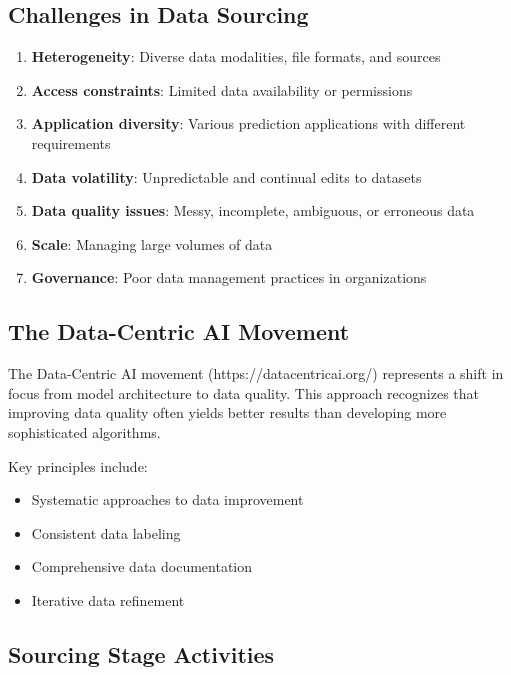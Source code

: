 \documentclass[12pt]{article}
\begin{document}
\subsection{Challenges in Data Sourcing}
\begin{enumerate}
    \item \textbf{Heterogeneity}: Diverse data modalities, file formats, and sources
    \item \textbf{Access constraints}: Limited data availability or permissions
    \item \textbf{Application diversity}: Various prediction applications with different requirements
    \item \textbf{Data volatility}: Unpredictable and continual edits to datasets
    \item \textbf{Data quality issues}: Messy, incomplete, ambiguous, or erroneous data
    \item \textbf{Scale}: Managing large volumes of data
    \item \textbf{Governance}: Poor data management practices in organizations
\end{enumerate}

\subsection{The Data-Centric AI Movement}

\begin{tcolorbox}[colback=blue!5!white,colframe=blue!75!black,title={Data-Centric AI}]
The Data-Centric AI movement (https://datacentricai.org/) represents a shift in focus from model architecture to data quality. This approach recognizes that improving data quality often yields better results than developing more sophisticated algorithms.

Key principles include:
\begin{itemize}
    \item Systematic approaches to data improvement
    \item Consistent data labeling
    \item Comprehensive data documentation
    \item Iterative data refinement
\end{itemize}
\end{tcolorbox}

\subsection{Sourcing Stage Activities}
\end{document}
